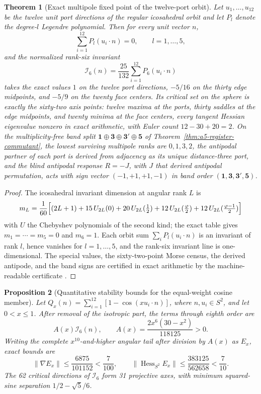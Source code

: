 \documentclass[11pt]{article}
\newtheorem{theorem}{Theorem}[section]
\newtheorem{proposition}[theorem]{Proposition}
\theoremstyle{remark}
\theoremstyle{plain}
\begin{document}
\begin{theorem}[Exact multipole fixed point of the twelve-port orbit]
\label{thm:twelve-port-multipole-fixed-point}
Let \(u_1,\ldots,u_{12}\) be the twelve unit port directions of the regular
icosahedral orbit and let \(P_l\) denote the degree-\(l\) Legendre
polynomial. Then for every unit vector \(n\),
\[
\sum_{i=1}^{12}P_l(u_i\cdot n)=0,
\qquad l=1,\ldots,5,
\]
and the normalized rank-six invariant
\[
\mathcal I_6(n)=\frac{25}{132}\sum_{i=1}^{12}P_6(u_i\cdot n)
\]
takes the exact values \(1\) on the twelve port directions, \(-5/16\) on the
thirty edge midpoints, and \(-5/9\) on the twenty face centers. Its critical
set on the sphere is exactly the sixty-two axis points: twelve maxima at the
ports, thirty saddles at the edge midpoints, and twenty minima at the face
centers, every tangent Hessian eigenvalue nonzero in exact arithmetic, with
Euler count \(12-30+20=2\). On the multiplicity-free band split
\(\mathbf1\oplus\mathbf3\oplus\mathbf3'\oplus\mathbf5\) of
Theorem~\ref{thm:a5-register-commutant}, the lowest surviving multipole ranks
are \(0,1,3,2\), the antipodal partner of each port is derived from adjacency
as its unique distance-three port, and the blind antipodal response
\(R=-J\), with \(J\) that derived antipodal permutation, acts with sign
vector \((-1,+1,+1,-1)\) in band order
\((\mathbf1,\mathbf3,\mathbf3',\mathbf5)\).
\end{theorem}

\begin{proof}
The icosahedral invariant dimension at angular rank \(L\) is
\[
m_L=\frac1{60}\Bigl[(2L+1)+15\,U_{2L}(0)+20\,U_{2L}(\tfrac12)
+12\,U_{2L}(\tfrac\varphi2)+12\,U_{2L}(\tfrac{\varphi-1}2)\Bigr]
\]
with \(U\) the Chebyshev polynomials of the second kind; the exact table
gives \(m_1=\cdots=m_5=0\) and \(m_6=1\). Each orbit sum
\(\sum_iP_l(u_i\cdot n)\) is an invariant of rank \(l\), hence vanishes for
\(l=1,\ldots,5\), and the rank-six invariant line is one-dimensional. The
special values, the sixty-two-point Morse census, the derived antipode, and
the band signs are certified in exact arithmetic by the machine-readable
certificate \cite{ophrepo}.
\end{proof}

\begin{proposition}[Quantitative stability bounds for the equal-weight cosine member]
Let \(Q_x(n)=\sum_{i=1}^{12}[1-\cos(xu_i\cdot n)]\), where
\(n,u_i\in S^2\), and let \(0<x\le1\). After removal of the isotropic part,
the terms through eighth order are
\[
A(x)\mathcal I_6(n),\qquad
A(x)=\frac{2x^6(30-x^2)}{118125}>0.
\]
Writing the complete \(x^{10}\)-and-higher angular tail after division by
\(A(x)\) as \(E_x\), exact bounds are
\[
\|\nabla E_x\|\le\frac{6875}{101152}<\frac7{100},\qquad
\|\operatorname{Hess}_{S^2}E_x\|
\le\frac{383125}{562658}<\frac7{10}.
\]
The 62 critical directions of \(\mathcal I_6\) form 31 projective axes, with
minimum squared-sine separation \(1/2-\sqrt5/6\).
\end{proposition}
\end{document}
